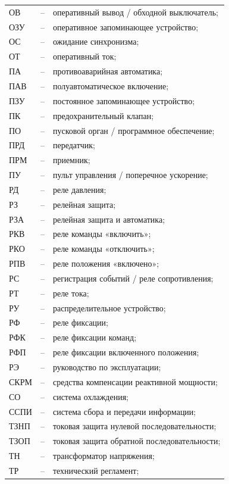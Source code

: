 \begin{longtable}{>{\raggedright\arraybackslash}m{2cm}>{\raggedright\arraybackslash}m{0.5cm}>{\raggedright\arraybackslash}m{20cm}}
ОВ & -- & оперативный вывод / обходной выключатель; \\
ОЗУ & -- & оперативное запоминающее устройство; \\
ОС & -- & ожидание синхронизма; \\
ОТ & -- & оперативный ток; \\
ПА & -- & противоаварийная автоматика; \\
ПАВ & -- & полуавтоматическое включение; \\
ПЗУ & -- & постоянное запоминающее устройство; \\
ПК & -- & предохранительный клапан; \\
ПО & -- & пусковой орган / программное обеспечение; \\
ПРД & -- & передатчик; \\
ПРМ & -- & приемник; \\
ПУ & -- & пульт управления / поперечное ускорение; \\
РД & -- & реле давления; \\
РЗ & -- & релейная защита; \\
РЗА & -- & релейная защита и автоматика; \\
РКВ & -- & реле команды «включить»; \\
РКО & -- & реле команды «отключить»; \\
РПВ & -- & реле положения «включено»; \\
РС & -- & регистрация событий / реле сопротивления; \\
РТ & -- & реле тока; \\
РУ & -- & распределительное устройство; \\
РФ & -- & реле фиксации; \\
РФК & -- & реле фиксации команд; \\
РФП & -- & реле фиксации включенного положения; \\
РЭ & -- & руководство по эксплуатации; \\
СКРМ & -- & средства компенсации реактивной мощности; \\
СО & -- & система охлаждения; \\
ССПИ & -- & система сбора и передачи информации; \\
ТЗНП & -- & токовая защита нулевой последовательности; \\
ТЗОП & -- & токовая защита обратной последовательности; \\
ТН & -- & трансформатор напряжения; \\
ТР & -- & технический регламент; \\

\end{longtable}
